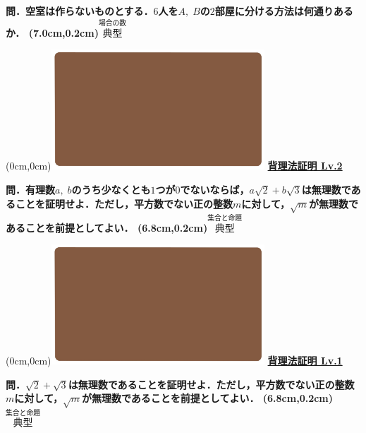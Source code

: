 \documentclass[10pt,
fleqn,
dvipdfmx,
uplatex
]{jsarticle}
\begin{document}
\LARGE 
\bf\boldmath 問．空室は作らないものとする．$6$人を$A,\;B$の$2$部屋に分ける方法は何通りあるか．
\at(7.0cm,0.2cm){\small\color{bradorange}$\overset{\text{場合の数}}{\text{典型}}$}


\newpage



\at(0cm,0cm){\includegraphics[width=8cm,bb=0 0 1920 1080]{./youtube/thumbnails/templates/smart_background/集合と命題.jpeg}}
{\color{orange}\bf\boldmath\huge\underline{背理法証明 Lv.2 }}\vspace{0.3zw}

\large 
\bf\boldmath 問．有理数$a,\;b$のうち少なくとも$1$つが$0$でないならば，$a\sqrt 2+b\sqrt 3$は無理数であることを証明せよ．ただし，平方数でない正の整数$m$に対して，$\sqrt m$が無理数であることを前提としてよい．
\at(6.8cm,0.2cm){\small\color{bradorange}$\overset{\text{集合と命題}}{\text{典型}}$}


\newpage



\at(0cm,0cm){\includegraphics[width=8cm,bb=0 0 1920 1080]{./youtube/thumbnails/templates/smart_background/集合と命題.jpeg}}
{\color{orange}\bf\boldmath\huge\underline{背理法証明 Lv.1 }}\vspace{0.3zw}

\Large 
\bf\boldmath 問．$\sqrt 2+\sqrt 3$は無理数であることを証明せよ．ただし，平方数でない正の整数$m$に対して，$\sqrt m$が無理数であることを前提としてよい．
\at(6.8cm,0.2cm){\small\color{bradorange}$\overset{\text{集合と命題}}{\text{典型}}$}


\newpage
\end{document}
